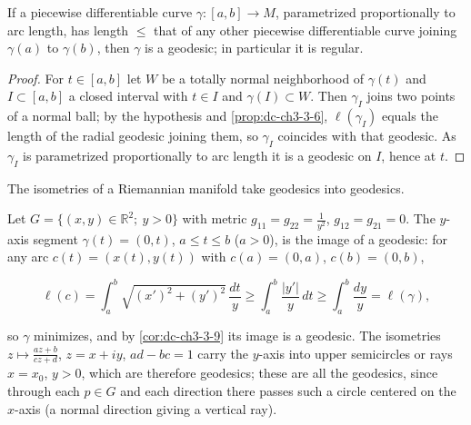 \begin{corollary}
  \label{cor:dc-ch3-3-9}
  \leanok
  If a piecewise differentiable curve $\gamma:[a,b]\to M$, parametrized
  proportionally to arc length, has length $\le$ that of any other piecewise
  differentiable curve joining $\gamma(a)$ to $\gamma(b)$, then $\gamma$ is a
  geodesic; in particular it is regular.
\end{corollary}
\begin{proof}
  \sketch
  \leanok
  For $t\in[a,b]$ let $W$ be a totally normal neighborhood of $\gamma(t)$
  and $I\subset[a,b]$ a closed interval with $t\in I$ and $\gamma(I)\subset W$.
  Then $\gamma_I$ joins two points of a normal ball; by the hypothesis and
  \cref{prop:dc-ch3-3-6}, $\ell(\gamma_I)$ equals the length of the radial geodesic joining
  them, so $\gamma_I$ coincides with that geodesic. As $\gamma_I$ is parametrized
  proportionally to arc length it is a geodesic on $I$, hence at $t$.
\end{proof}

\begin{example}
  \label{ex:dc-ch3-3-10}
  \notready
  The isometries of a Riemannian manifold take geodesics into geodesics.
  
  Let $G=\{(x,y)\in\mathbb{R}^2;\ y>0\}$ with metric $g_{11}=g_{22}=\frac{1}{y^2}$,
  $g_{12}=g_{21}=0$. The $y$-axis segment $\gamma(t)=(0,t)$, $a\le t\le b$ ($a>0$),
  is the image of a geodesic: for any arc $c(t)=(x(t),y(t))$ with $c(a)=(0,a)$,
  $c(b)=(0,b)$,
  
  $$
  \ell(c)=\int_a^b\sqrt{(x')^2+(y')^2}\,\frac{dt}{y}\ge\int_a^b\frac{|y'|}{y}\,dt\ge\int_a^b\frac{dy}{y}=\ell(\gamma),
  $$
  
  so $\gamma$ minimizes, and by \cref{cor:dc-ch3-3-9} its image is a geodesic. The
  isometries $z\mapsto\frac{az+b}{cz+d}$, $z=x+iy$, $ad-bc=1$ carry the $y$-axis
  into upper semicircles or rays $x=x_0$, $y>0$, which
  are therefore geodesics; these are all the geodesics, since through each $p\in G$
  and each direction there passes such a circle centered on the $x$-axis (a normal
  direction giving a vertical ray).
\end{example}

